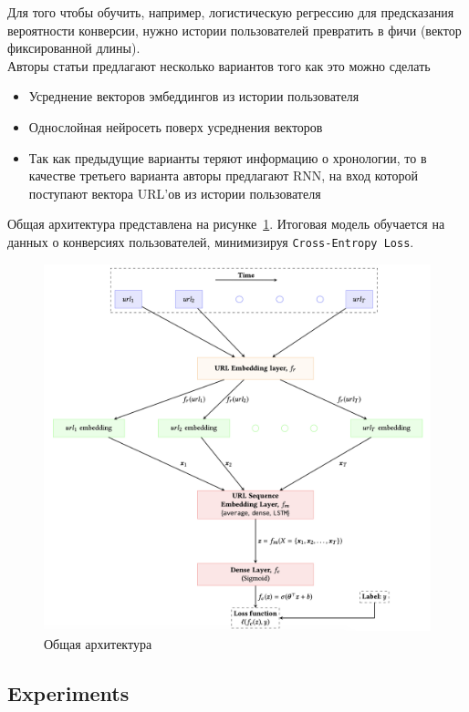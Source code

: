 Для того чтобы обучить, например, логистическую регрессию для предсказания вероятности конверсии, нужно истории пользователей превратить в фичи (вектор фиксированной длины). \\

Авторы статьи предлагают несколько вариантов того как это можно сделать
\begin{itemize}
    \item Усреднение векторов эмбеддингов из истории пользователя
    \item Однослойная нейросеть поверх усреднения векторов
    \item Так как предыдущие варианты теряют информацию о хронологии, то в качестве третьего варианта авторы предлагают RNN, на вход которой поступают вектора URL'ов из истории пользователя
\end{itemize}

Общая архитектура представлена на рисунке~\ref{fig:predicting_conversion}. Итоговая модель обучается на данных о конверсиях пользователей, минимизируя \texttt{Cross-Entropy Loss}.

\begin{figure}[ht]
    \centering
    \includegraphics[width=0.8\linewidth]{images/predicting_conversions.png}
    \caption{Общая архитектура}
    \label{fig:predicting_conversion}
\end{figure}

\subsection{Experiments}

